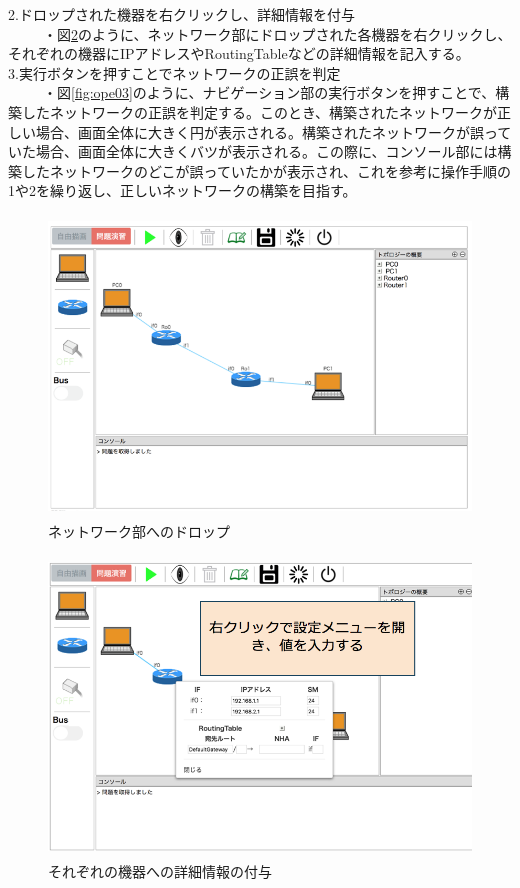 2.ドロップされた機器を右クリックし、詳細情報を付与\\
~~~~~・図\ref{fig:ope02}のように、ネットワーク部にドロップされた各機器を右クリックし、それぞれの機器にIPアドレスやRoutingTableなどの詳細情報を記入する。\\
3.実行ボタンを押すことでネットワークの正誤を判定\\
~~~~~・図\ref{fig:ope03}のように、ナビゲーション部の実行ボタンを押すことで、構築したネットワークの正誤を判定する。このとき、構築されたネットワークが正しい場合、画面全体に大きく円が表示される。構築されたネットワークが誤っていた場合、画面全体に大きくバツが表示される。この際に、コンソール部には構築したネットワークのどこが誤っていたかが表示され、これを参考に操作手順の1や2を繰り返し、正しいネットワークの構築を目指す。

\begin{figure}[htbp]
  \begin{center}
    \includegraphics[clip,width=12.0cm,height=8.0cm]{img/operation01.png}
    \caption{ネットワーク部へのドロップ}
    \label{fig:ope01}
  \end{center}
\end{figure}

\begin{figure}[htbp]
  \begin{center}
    \includegraphics[clip,width=12.0cm,height=8.0cm]{img/operation02.png}
    \caption{それぞれの機器への詳細情報の付与}
    \label{fig:ope02}
  \end{center}
\end{figure}

